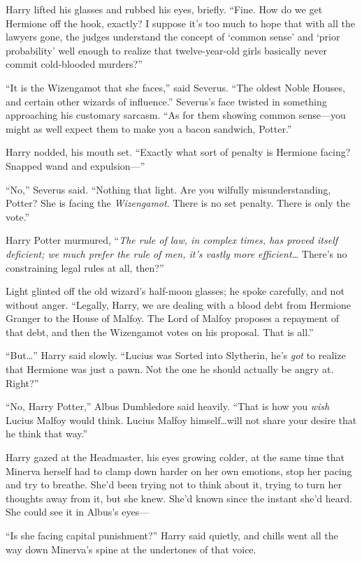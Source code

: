 Harry lifted his glasses and rubbed his eyes, briefly. “Fine. How do we get Hermione off the hook, exactly? I suppose it’s too much to hope that with all the lawyers gone, the judges understand the concept of ‘common sense’ and ‘prior probability’ well enough to realize that twelve-year-old girls basically never commit cold-blooded murders?”

“It is the Wizengamot that she faces,” said Severus. “The oldest Noble Houses, and certain other wizards of influence.” Severus’s face twisted in something approaching his customary sarcasm. “As for them showing common sense—you might as well expect them to make you a bacon sandwich, Potter.”

Harry nodded, his mouth set. “Exactly what sort of penalty is Hermione facing? Snapped wand and expulsion—”

“No,” Severus said. “Nothing that light. Are you wilfully misunderstanding, Potter? She is facing the \emph{Wizengamot}. There is no set penalty. There is only the vote.”

Harry Potter murmured, “\emph{The rule of law, in complex times, has proved itself deficient; we much prefer the rule of men, it’s vastly more efficient…} There’s no constraining legal rules at all, then?”

Light glinted off the old wizard’s half-moon glasses; he spoke carefully, and not without anger. “Legally, Harry, we are dealing with a blood debt from Hermione Granger to the House of Malfoy. The Lord of Malfoy proposes a repayment of that debt, and then the Wizengamot votes on his proposal. That is all.”

“But…” Harry said slowly. “Lucius was Sorted into Slytherin, he’s \emph{got} to realize that Hermione was just a pawn. Not the one he should actually be angry at. Right?”

“No, Harry Potter,” Albus Dumbledore said heavily. “That is how you \emph{wish} Lucius Malfoy would think. Lucius Malfoy himself…will not share your desire that he think that way.”

Harry gazed at the Headmaster, his eyes growing colder, at the same time that Minerva herself had to clamp down harder on her own emotions, stop her pacing and try to breathe. She’d been trying not to think about it, trying to turn her thoughts away from it, but she knew. She’d known since the instant she’d heard. She could see it in Albus’s eyes—

“Is she facing capital punishment?” Harry said quietly, and chills went all the way down Minerva’s spine at the undertones of that voice.

